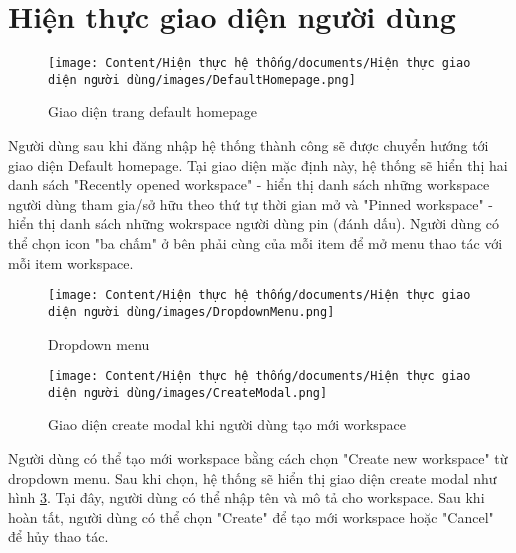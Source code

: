 \section{Hiện thực giao diện người dùng}

\begin{figure}[H]
    \centering
    \texttt{[image: Content/Hiện thực hệ thống/documents/Hiện thực giao diện người dùng/images/DefaultHomepage.png]}
    \vspace{0.5cm}
    \caption{Giao diện trang default homepage}
    \label{fig: Giao diện trang default homepage}
\end{figure}

Người dùng sau khi đăng nhập hệ thống thành công sẽ được chuyển hướng tới giao diện Default homepage. Tại giao diện mặc định này, hệ thống sẽ hiển thị hai danh sách "Recently opened workspace" - hiển thị danh sách những workspace người dùng tham gia/sở hữu theo thứ tự thời gian mở và "Pinned workspace" - hiển thị danh sách những wokrspace người dùng pin (đánh dấu). Người dùng có thể chọn icon "ba chấm" ở bên phải cùng của mỗi item để mở menu thao tác với mỗi item workspace.

\begin{figure}[H]
    \centering
    \texttt{[image: Content/Hiện thực hệ thống/documents/Hiện thực giao diện người dùng/images/DropdownMenu.png]}
    \vspace{0.5cm}
    \caption{Dropdown menu}
    \label{fig: Giao diện dropdown menu của mỗi item workspace}
\end{figure}

\begin{figure}[H]
    \centering
    \texttt{[image: Content/Hiện thực hệ thống/documents/Hiện thực giao diện người dùng/images/CreateModal.png]}
    \vspace{0.5cm}
    \caption{Giao diện create modal khi người dùng tạo mới workspace}
    \label{fig: Giao diện create modal khi người dùng tạo mới workspace}
\end{figure}

Người dùng có thể tạo mới workspace bằng cách chọn "Create new workspace" từ dropdown menu. Sau khi chọn, hệ thống sẽ hiển thị giao diện create modal như hình \ref{fig: Giao diện create modal khi người dùng tạo mới workspace}. Tại đây, người dùng có thể nhập tên và mô tả cho workspace. Sau khi hoàn tất, người dùng có thể chọn "Create" để tạo mới workspace hoặc "Cancel" để hủy thao tác.

